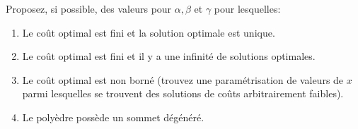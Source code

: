 \begin{enumerate}
    Proposez, si possible,
    des valeurs pour $\alpha, \beta$ et $\gamma$ pour lesquelles:

    \begin{enumerate}

      \item Le coût optimal est fini et la solution optimale est unique.

      \item Le coût optimal est fini
        et il y a une infinité de solutions optimales.

      \item Le coût optimal est non borné
        (trouvez une paramétrisation de valeurs de $x$
        parmi lesquelles se trouvent des solutions de coûts
        arbitrairement faibles).

      \item Le poly\`edre possède un sommet dégénéré.

    \end{enumerate}


\end{enumerate}
